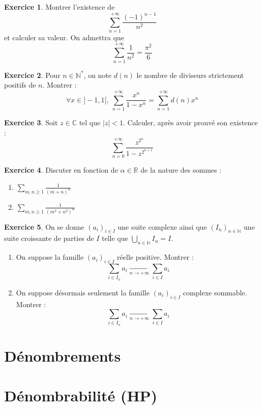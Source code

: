 \documentclass[french]{book}
\newcommand{\N}{\mathbb{N}}
\newcommand{\R}{\mathbb{R}}
\newcommand{\C}{\mathbb{C}}
\newcommand{\st}{^*}
\theoremstyle{definition}
\newtheorem{ex}{Exercice}[chapter]
\theoremstyle{theorem}
\theoremstyle{remark}
\begin{document}
\begin{ex}
	Montrer l'existence de $$\sum_{n=1}^{+\infty}\frac{(-1)^{n-1}}{n^2}$$ et calculer sa valeur. On admettra que $$\sum_{n=1}^{+\infty}\frac{1}{n^2}=\frac{\pi^2}{6}$$
\end{ex}

\begin{ex}
	Pour $n\in\N\st$, on note $d(n)$ le nombre de diviseurs strictement positifs de $n$. Montrer : $$\forall x\in]-1,1[,\ \sum_{n=1}^{+\infty}\frac{x^n}{1-x^n}=\sum_{n=1}^{+\infty}d(n)x^n$$
\end{ex}

\begin{ex}
	Soit $z\in\C$ tel que $\lvert z\rvert<1$. Calculer, après avoir prouvé son existence : $$\sum_{n=0}^{+\infty}\frac{z^{2^n}}{1-z^{2^{n+1}}}$$
\end{ex}

\begin{ex}
	Discuter en fonction de $\alpha\in\R$ de la nature des sommes : 
	\begin{enumerate}
		\item $\displaystyle\sum_{m,n\geqslant 1}\frac{1}{(m+n)^\alpha}$
		\item $\displaystyle\sum_{m,n\geqslant 1}\frac{1}{(m^2+n^2)^\alpha}$
	\end{enumerate}
\end{ex}

\begin{ex}
	On se donne $(a_i)_{i\in I}$ une suite complexe ainsi que $(I_n)_{n\in\N}$ une suite croissante de parties de $I$ telle que $\displaystyle\bigcup_{n\in\N}I_n=I$.
	\begin{enumerate}
		\item On suppose la famille $(a_i)_{i\in I}$ réelle positive. Montrer : $$\sum_{i\in I_n}a_i\xrightarrow[n\to+\infty]{}\sum_{i\in I} a_i$$
		\item On suppose désormais seulement la famille $(a_i)_{i\in I}$ complexe sommable. Montrer : $$\sum_{i\in I_n}a_i\xrightarrow[n\to+\infty]{}\sum_{i\in I} a_i$$
	\end{enumerate}
\end{ex}





\chapter{Dénombrements}


\chapter{Dénombrabilité (HP)}
\end{document}
